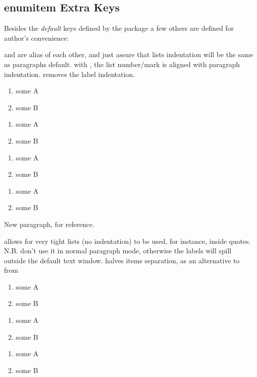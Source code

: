 \documentclass[dctools,english,tocdepth=3,secdepth=3]{ufrgscca} %
\begin{document}
\subsection{enumitem Extra Keys}
Besides the \emph{default} keys defined by the  package a few others are defined for author's convenience:
\begin{Keys}
	  and  are alias of each other, and just assure that lists indentation will be the same as paragraphs default.
	 with , the list number/mark is aligned with paragraph indentation.
	  removes the label indentation.

	\begin{stcode}[st=enumA]
\begin{enumerate}[tcc]
	\item some A
	\item some B
\end{enumerate}
\begin{enumerate}
	\item some A
	\item some B
\end{enumerate}
\begin{enumerate}[parindent]
	\item some A
	\item some B
\end{enumerate}
\begin{enumerate}[noindent]
	\item some A
	\item some B
\end{enumerate}

New paragraph, for reference.
\end{stcode}


	 allows for very tight lists (no indentation) to be used, for instance, inside quotes. N.B. don't use it in normal paragraph mode, otherwise the labels will spill outside the default text window.
	  halves items separation, as an alternative to  from 
	\begin{stcode}[st=enumB]
	\begin{enumerate}[tcc]
		\item some A
		\item some B
	\end{enumerate}
	\begin{enumerate}
		\item some A
		\item some B
	\end{enumerate}
	\begin{enumerate}
		\item some A
		\item some B
	\end{enumerate}
\end{stcode}


\end{Keys}
\end{document}
